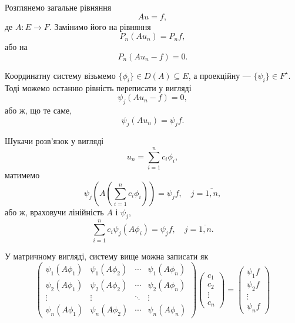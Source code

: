 Розглянемо загальне рівняння
\begin{equation}
    \label{eq:2.1.1}
    A u = f,
\end{equation}
де $A: E \to F$. Замінимо його на рівняння
\begin{equation}
    \label{eq:2.1.2}
    P_n(A u_n) = P_n f,
\end{equation}
або на
\begin{equation}
    \label{eq:2.1.3}
    P_n (A u_n - f) = 0.
\end{equation}

Координатну систему візьмемо $\{\phi_i\} \in D(A) \subseteq E$, а проекційну --- $\{\psi_i\} \in F^\star$. %
Тоді можемо останню рівність переписати у вигляді
\begin{equation}
    \label{eq:2.1.4}
    \psi_j (A u_n - f) = 0,
\end{equation}
або ж, що те саме,
\begin{equation}
    \label{eq:2.1.5}
    \psi_j (A u_n) = \psi_j f.
\end{equation}

Шукачи розв'язок у вигляді
\begin{equation}
    \label{eq:2.1.6}
    u_n = \sum_{i = 1}^n c_i \phi_i,
\end{equation}
матимемо
\begin{equation}
    \label{eq:2.1.7}
    \psi_j \left( A \left( \sum_{i = 1}^n c_i \phi_i \right) \right) = \psi_j f, \quad j = \overline{1, n},
\end{equation}
або ж, враховучи лінійність $A$ і $\psi_j$,
\begin{equation}
    \label{eq:2.1.8}
    \sum_{i = 1}^n c_i \psi_j (A \phi_i) = \psi_j f, \quad j = \overline{1, n}.
\end{equation}

У матричному вигляді, систему вище можна записати як
\begin{equation}
    \label{eq:2.1.9}
    \begin{pmatrix}
        \psi_1 (A \phi_1) & \psi_1 (A \phi_2) & \cdots & \psi_1 (A \phi_n) \\
        \psi_2 (A \phi_1) & \psi_2 (A \phi_2) & \cdots & \psi_2 (A \phi_n) \\
        \vdots & \vdots & \ddots & \vdots \\
        \psi_n (A \phi_1) & \psi_n (A \phi_2) & \cdots & \psi_n (A \phi_n)
    \end{pmatrix}
    \begin{pmatrix}
        c_1 \\ c_2 \\ \vdots \\ c_n
    \end{pmatrix}
    =
    \begin{pmatrix}
        \psi_1 f \\ \psi_2 f \\ \vdots \\ \psi_n f
    \end{pmatrix}
\end{equation}

